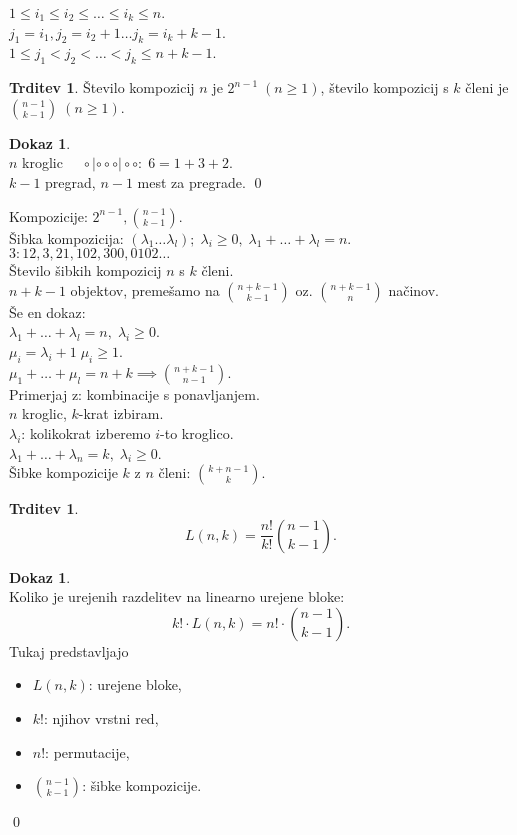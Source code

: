 \documentclass[a4paper, 12pt]{book}
\theoremstyle{definition}
\newtheorem{claim}[counter]{Trditev}
\newtheorem{pro}[counter]{Dokaz}
\theoremstyle{remark}
\begin{document}
$1 \leq i_1 \leq i_2 \leq \dots \leq i_k \leq n$. \\
$j_1 = i_1, j_2 = i_2+1 \dots j_k = i_k+k-1$. \\
$1 \leq j_1 < j_2 < \dots < j_k \leq n+k-1$.
\begin{claim}
  Število kompozicij $n$ je $2^{n-1} \; (n \geq 1)$, število kompozicij s $k$ členi je $\binom{n-1}{k-1} \; (n \geq 1)$.
\end{claim}
\begin{pro} \text{} \\
  $n$ kroglic $\quad \circ | \circ \circ \circ | \circ \circ: \; 6 = 1 + 3 + 2$. \\
  $k-1$ pregrad, $n-1$ mest za pregrade.
  \qed
\end{pro}
%
%
%
Kompozicije: $2^{n-1}, \binom{n-1}{k-1}$. \\
Šibka kompozicija: $(\lambda_1 \dots \lambda_l); \; \lambda_i \geq 0, \; \lambda_1 + \dots + \lambda_l = n$. \\
$3: 12, 3, 21, 102, 300, 0102 \dots$ \\
Število šibkih kompozicij $n$ s $k$ členi. \\
$n+k-1$ objektov, premešamo na $\binom{n+k-1}{k-1}$ oz. $\binom{n+k-1}{n}$ načinov. \\
Še en dokaz: \\
$\lambda_1 + \dots + \lambda_l = n, \; \lambda_i \geq 0$. \\
$\mu_i = \lambda_i + 1 \; \mu_i \geq 1$. \\
$\mu_1 + \dots + \mu_l = n + k \implies \binom{n+k-1}{n-1}$. \\
Primerjaj z: kombinacije s ponavljanjem. \\
$n$ kroglic, $k$-krat izbiram. \\
$\lambda_i$: kolikokrat izberemo $i$-to kroglico. \\
$\lambda_1 + \dots + \lambda_n = k, \; \lambda_i \geq 0$. \\
Šibke kompozicije $k$ z $n$ členi: $\binom{k+n-1}{k}$.
\begin{claim}
  \begin{equation*}
    L(n,k) = \frac{n!}{k!} \binom{n-1}{k-1}.
  \end{equation*}
\end{claim}
\begin{pro} \text{} \\
  Koliko je urejenih razdelitev na linearno urejene bloke:
  \begin{equation*}
    k! \cdot L(n,k) = n! \cdot \binom{n-1}{k-1}.
  \end{equation*}
  Tukaj predstavljajo
  \begin{itemize}
    \item $L(n,k)$: urejene bloke,
    \item $k!$: njihov vrstni red,
    \item $n!$: permutacije,
    \item $\binom{n-1}{k-1}$: šibke kompozicije.
  \end{itemize}
  \qed
\end{pro}
\end{document}
